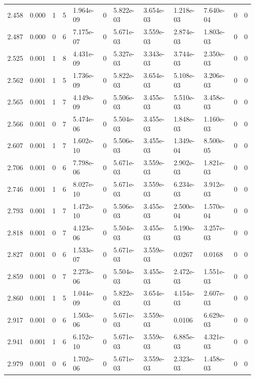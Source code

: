 \documentclass[preview]{standalone}
\begin{document}
{{{\begin{tabular}{L{1.2cm}C{1.2cm} C{0.3cm}C{0.5cm} C{1.4cm}C{1.4cm} C{1.4cm}C{1.4cm} C{1.6cm}C{1.6cm} C{1.6cm}C{1.6cm}}
  2.458  &  0.000  & 1     &  5 &  1.964e-09  & 0  &  5.822e-03&   3.654e-03& 1.218e-03 & 7.640e-04   &  0 & 0  \\ 
  2.487  &  0.000  & 0     &  6 &  7.175e-07  & 0  &  5.671e-03&   3.559e-03& 2.874e-03 & 1.803e-03   &  0 & 0  \\ 
  2.525  &  0.001  & 1     &  8 &  4.431e-09  & 0  &  5.327e-03&   3.343e-03& 3.744e-03 & 2.350e-03   &  0 & 0  \\ 
  2.562  &  0.001  & 1     &  5 &  1.736e-09  & 0  &  5.822e-03&   3.654e-03& 5.108e-03 & 3.206e-03   &  0 & 0  \\ 
  2.565  &  0.001  & 1     &  7 &  4.149e-09  & 0  &  5.506e-03&   3.455e-03& 5.510e-03 & 3.458e-03   &  0 & 0  \\ 
  2.566  &  0.001  & 0     &  7 &  5.474e-06  & 0  &  5.504e-03&   3.455e-03& 1.848e-03 & 1.160e-03   &  0 & 0  \\ 
  2.607  &  0.001  & 1     &  7 &  1.602e-10  & 0  &  5.506e-03&   3.455e-03& 1.349e-04 & 8.500e-05   &  0 & 0  \\ 
  2.706  &  0.001  & 0     &  6 &  7.798e-06  & 0  &  5.671e-03&   3.559e-03& 2.902e-03 & 1.821e-03   &  0 & 0  \\ 
  2.746  &  0.001  & 1     &  6 &  8.027e-10  & 0  &  5.671e-03&   3.559e-03& 6.234e-03 & 3.912e-03   &  0 & 0  \\ 
  2.793  &  0.001  & 1     &  7 &  1.472e-10  & 0  &  5.506e-03&   3.455e-03& 2.500e-04 & 1.570e-04   &  0 & 0  \\ 
  2.818  &  0.001  & 0     &  7 &  4.123e-06  & 0  &  5.504e-03&   3.455e-03& 5.190e-03 & 3.257e-03   &  0 & 0  \\ 
  2.827  &  0.001  & 0     &  6 &  1.533e-07  & 0  &  5.671e-03&   3.559e-03& 0.0267 & 0.0168   &  0 & 0  \\ 
  2.859  &  0.001  & 0     &  7 &  2.273e-06  & 0  &  5.504e-03&   3.455e-03& 2.472e-03 & 1.551e-03   &  0 & 0  \\ 
  2.860  &  0.001  & 1     &  5 &  1.044e-09  & 0  &  5.822e-03&   3.654e-03& 4.154e-03 & 2.607e-03   &  0 & 0  \\ 
  2.917  &  0.001  & 0     &  6 &  1.503e-06  & 0  &  5.671e-03&   3.559e-03& 0.0106 & 6.629e-03   &  0 & 0  \\ 
  2.941  &  0.001  & 1     &  6 &  6.152e-10  & 0  &  5.671e-03&   3.559e-03& 6.885e-03 & 4.321e-03   &  0 & 0  \\ 
  2.979  &  0.001  & 0     &  6 &  1.702e-06  & 0  &  5.671e-03&   3.559e-03& 2.323e-03 & 1.458e-03   &  0 & 0  \\ 

\end{tabular}}}}
\end{document}

